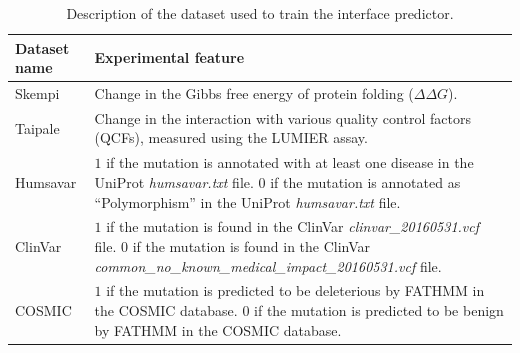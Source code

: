 \begin{table}[h]
\caption{Description of the dataset used to train the interface predictor.} \label{tab:interface_datasets}
\begin{tabular}{l | p{13cm}}
	\toprule
	Dataset name & Experimental feature \\
	\midrule
	Skempi \cite{kumar_protherm_2006} & Change in the Gibbs free energy of protein folding ($\Delta \Delta G$). \\
	Taipale \cite{sahni_widespread_2015} & Change in the interaction with various quality control factors (QCFs), measured using the LUMIER assay. \\
	Humsavar \cite{consortium_uniprot:_2015} & $1$ if the mutation is annotated with at least one disease in the UniProt \textit{humsavar.txt} file. $0$ if the mutation is annotated as ``Polymorphism'' in the UniProt \textit{humsavar.txt} file. \\
	ClinVar \cite{landrum_clinvar:_2016} & $1$ if the mutation is found in the ClinVar \textit{clinvar\_20160531.vcf} file. $0$ if the mutation is found in the ClinVar \textit{common\_no\_known\_medical\_impact\_20160531.vcf} file. \\
	COSMIC \cite{forbes_cosmic:_2015} & $1$ if the mutation is predicted to be deleterious by FATHMM in the COSMIC database. $0$ if the mutation is predicted to be benign by FATHMM in the COSMIC database. \\
	\bottomrule
\end{tabular}
\end{table}



